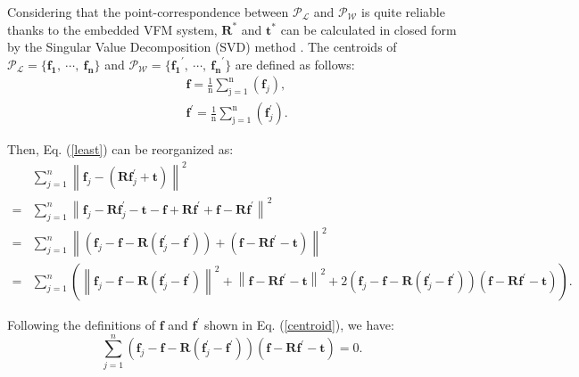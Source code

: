 Considering that the point-correspondence between $\mathcal{{P}_{L}} $ and $\mathcal{{P}_{W}}$ is quite reliable thanks to the embedded VFM system, $\mathbf{R}^{*}$ and $\mathbf{t}^{*}$ can be calculated in closed form by the Singular Value Decomposition (SVD) method \cite{barfoot,icp}. The centroids of $\mathcal{{P}_{L}} = \{ \mathbf{{f}_{1}}, \ \cdots, \ \mathbf{{f}_{n}}\}$ and $\mathcal{{P}_{W}}= \{ \mathbf{{f}_{1}}^{\prime}, \ \cdots, \ \mathbf{{f}_{n}}^{\prime} \}$ are defined as follows:
\begin{equation}
\begin{aligned}
&\mathbf{f}=\frac{1}{\mathrm{n}} \sum_{\mathrm{j}=1}^{\mathrm{n}}\left(\mathbf{f}_{j}\right), \\
&\mathbf{f}^{\prime}=\frac{1}{\mathrm{n}} \sum_{\mathrm{j}=1}^{\mathrm{n}}\left(\mathbf{f}_{j}^{\prime}\right). \label{centroid}
\end{aligned}
\end{equation}
\par
Then, Eq. (\ref{least}) can be reorganized as:
\begin{equation}
\begin{aligned}
	 &\sum_{j=1}^{n}\left\|\mathbf{f}_{j}-\left(\mathbf{R} \mathbf{f}_{j}^{\prime}+\mathbf{t}\right)\right\|^{2} \\ 
  = & \sum_{j=1}^{n}\left\| \mathbf{f}_{j} -\mathbf{R} \mathbf{f}_{j}^{\prime}-\mathbf{t} - \mathbf{f} +\mathbf{R}\mathbf{f}^{\prime} + \mathbf{f} - \mathbf{R}\mathbf{f}^{\prime} \right\|^{2} \\
  = & \sum_{j=1}^{n}\left\| \left(\mathbf{f}_{j} - \mathbf{f} -\mathbf{R}\left(\mathbf{f}_{j}^{\prime}-\mathbf{f}^{\prime}\right) \right) + \left(\mathbf{f}- \mathbf{R}\mathbf{f}^{\prime}-\mathbf{t}\right)
\right\|^{2} \\
  = & \sum_{j=1}^{n}\left(
  \left\| \mathbf{f}_{j} - \mathbf{f} -\mathbf{R}\left(\mathbf{f}_{j}^{\prime}-\mathbf{f}^{\prime}\right) \right\|^{2} +  \left\|\mathbf{f}- \mathbf{R}\mathbf{f}^{\prime}-\mathbf{t} \right\|^{2} + 2 \left(\mathbf{f}_{j} - \mathbf{f} -\mathbf{R}\left(\mathbf{f}_{j}^{\prime}-\mathbf{f}^{\prime}\right) \right)\left(\mathbf{f}- \mathbf{R}\mathbf{f}^{\prime}-\mathbf{t}\right) 
 \right). \label{eq3.6}
  \end{aligned}
\end{equation}
\par
Following the definitions of $\mathbf{f}$ and $\mathbf{f}^{\prime}$ shown in Eq. (\ref{centroid}), we have:
\begin{equation}	
\sum_{j=1}^{n}\left(\mathbf{f}_{j} - \mathbf{f} -\mathbf{R}\left(\mathbf{f}_{j}^{\prime}-\mathbf{f}^{\prime}\right) \right)\left(\mathbf{f}- \mathbf{R}\mathbf{f}^{\prime}-\mathbf{t}\right) =0.
\end{equation} \par
